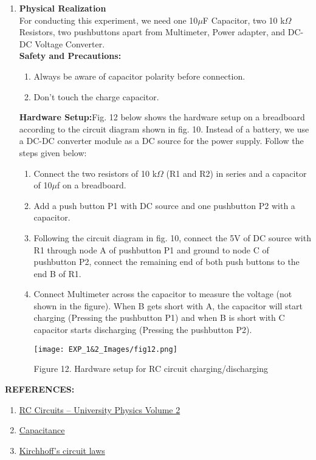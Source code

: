 \documentclass[12pt,a4paper]{article}
\begin{document}
\begin{justify}
\begin{enumerate}
\item \textbf{Physical Realization}\\[3pt]
For conducting this experiment, we need one 10$\mu$F Capacitor, two 10 k$\Omega$ Resistors, two pushbuttons apart from Multimeter, Power adapter, and DC-DC Voltage Converter.\\[3pt]
\textbf{Safety and Precautions:}
\begin{enumerate}
    \item Always be aware of capacitor polarity before connection.
    \item  Don't touch the charge capacitor.
\end{enumerate}

\textbf{Hardware Setup:}Fig. 12 below shows the hardware setup on a breadboard according to the circuit diagram shown in fig. 10. Instead of a battery, we use a DC-DC converter module as a DC source for the power supply. Follow the steps given below:
\begin{enumerate}
\item Connect the two resistors of 10 k$\Omega$ (R1 and R2) in series and a capacitor of 10$\mu$f on a breadboard.
\item Add a push button P1 with DC source and one pushbutton P2 with a capacitor.
\item Following the circuit diagram in fig. 10, connect the 5V of DC source with R1 through node A of pushbutton P1 and ground to node C of pushbutton P2, connect the remaining end of both push buttons to the end B of R1.
\item Connect Multimeter across the capacitor to measure the voltage (not shown in the figure). When B gets short with A, the capacitor will start charging (Pressing the pushbutton P1) and when B is short with C capacitor starts discharging (Pressing the pushbutton P2). 

    \begin{center} 
    \texttt{[image: EXP\_1\&2\_Images/fig12.png]}
    \end{center}
    \vspace{-5mm}
    \begin{center} {Figure 12. Hardware setup for RC circuit charging/discharging}\end{center}

\end{enumerate}
\end{enumerate}


\setlength{\parindent}{0eM}
\textbf{\large REFERENCES:}
\vspace{-6mm}
\begin{enumerate}
\setlength\itemsep{-0.3em}
 \item  \href{https://opentextbc.ca/universityphysicsv2openstax/chapter/rc-circuits/}{RC Circuits – University Physics Volume 2}
\item   \href{http://www.physbot.co.uk/capacitance.html}{Capacitance}
\item \href{https://en.wikipedia.org/wiki/Kirchhoff%27s_circuit_laws}{Kirchhoff's circuit laws}
\end{enumerate}


\end{justify}
\end{document}
